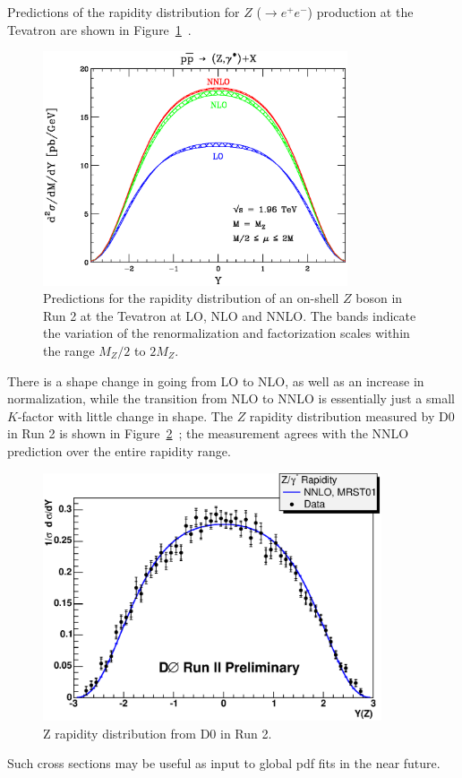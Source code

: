 \documentclass[12pt]{iopart}
\begin{document}
Predictions of the rapidity distribution for $Z$ ($\rightarrow e^+e^-$) production at the Tevatron are shown in 
Figure~\ref{fig:tev2z}~\cite{ Anastasiou:2003yy,Anastasiou:2003ds}.
%
\begin{figure}[t]
\begin{center}
\includegraphics[width=9cm]{TEVII_Z_Mz.ps}
\end{center}
\vspace*{-0.5cm}
\caption{
Predictions for the rapidity distribution of an on-shell $Z$ boson in Run 2 at the Tevatron at LO, NLO and NNLO. The bands indicate the
variation of the renormalization and factorization scales within the range $M_Z/2$ to $2M_Z$.
\label{fig:tev2z}}
\end{figure}
%
There is a shape change in going from LO to NLO, as well as an increase in normalization, while the transition from NLO to NNLO is
essentially just a small $K$-factor with little change in shape. The $Z$ rapidity distribution measured by D0 in Run 2 is shown in
Figure~\ref{fig:d0_z_y}~\cite{D0WZ}; the measurement agrees with the NNLO prediction over the entire rapidity range.
%
\begin{figure}[t]
\begin{center}
\includegraphics[width=10cm]{E12F05.eps}
\end{center}
\vspace*{-0.5cm}
\caption{
Z rapidity distribution from D0 in Run 2.
\label{fig:d0_z_y}}
\end{figure}
%
Such cross sections may be useful as input to global pdf fits in the near future. 
\end{document}
